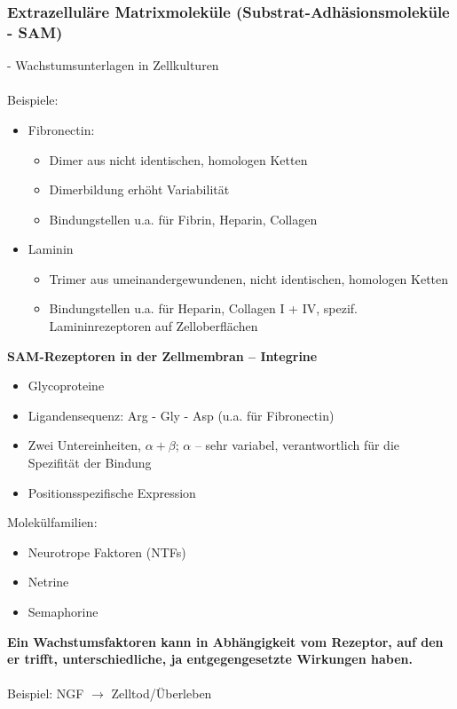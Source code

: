 \subsubsection{Extrazelluläre Matrixmoleküle (Substrat-Adhäsionsmoleküle - SAM)}
 - Wachstumsunterlagen in Zellkulturen
\\\\
Beispiele:
\begin{itemize}
	\item Fibronectin: 
	\begin{itemize}
		\item Dimer aus nicht identischen, homologen Ketten
		\item Dimerbildung erhöht Variabilität
		\item Bindungstellen u.a. für Fibrin, Heparin, Collagen
	\end{itemize}
	\item Laminin
	\begin{itemize}
		\item Trimer aus umeinandergewundenen, nicht identischen, homologen Ketten
		\item Bindungstellen u.a. für Heparin, Collagen I + IV, spezif. Lamininrezeptoren auf Zelloberflächen
	\end{itemize}
\end{itemize}

\textbf{SAM-Rezeptoren in der Zellmembran -- Integrine}
\begin{itemize}
	\item Glycoproteine
	\item Ligandensequenz: Arg - Gly - Asp (u.a. für Fibronectin)
	\item Zwei Untereinheiten, $\alpha + \beta$; $\alpha$ – sehr variabel, verantwortlich für die Spezifität der Bindung
	\item Positionsspezifische Expression
\end{itemize}

Molekülfamilien:
\begin{itemize}
	\item Neurotrope Faktoren (NTFs)
	\item Netrine
	\item Semaphorine
\end{itemize}

\textbf{Ein Wachstumsfaktoren kann in Abhängigkeit vom Rezeptor, auf den er trifft, unterschiedliche, ja entgegengesetzte Wirkungen haben.}\\\\
Beispiel: NGF $\rightarrow$ Zelltod/Überleben

